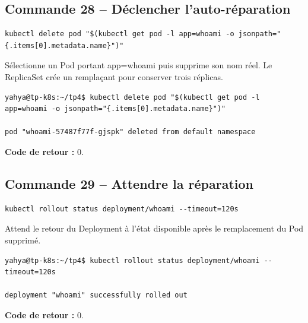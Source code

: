 \documentclass[11pt,a4paper]{article}
\begin{document}
\subsection{Commande 28 -- Déclencher l’auto-réparation}
\begin{lstlisting}
kubectl delete pod "$(kubectl get pod -l app=whoami -o jsonpath="{.items[0].metadata.name}")"
\end{lstlisting}
Sélectionne un Pod portant app=whoami puis supprime son nom réel. Le ReplicaSet crée un remplaçant pour conserver trois réplicas.
\begin{tcolorbox}[terminal,title={Ubuntu / WSL2 -- Commande 28 -- rendu reconstitué}]
\begin{Verbatim}[fontsize=\scriptsize,breaklines=true,breakanywhere=true,breaksymbolleft={},breaksymbolright={}]
yahya@tp-k8s:~/tp4$ kubectl delete pod "$(kubectl get pod -l app=whoami -o jsonpath="{.items[0].metadata.name}")"

pod "whoami-57487f77f-gjspk" deleted from default namespace
\end{Verbatim}
\end{tcolorbox}
\textbf{Code de retour :} 0.

\subsection{Commande 29 -- Attendre la réparation}
\begin{lstlisting}
kubectl rollout status deployment/whoami --timeout=120s
\end{lstlisting}
Attend le retour du Deployment à l’état disponible après le remplacement du Pod supprimé.
\begin{tcolorbox}[terminal,title={Ubuntu / WSL2 -- Commande 29 -- rendu reconstitué}]
\begin{Verbatim}[fontsize=\scriptsize,breaklines=true,breakanywhere=true,breaksymbolleft={},breaksymbolright={}]
yahya@tp-k8s:~/tp4$ kubectl rollout status deployment/whoami --timeout=120s

deployment "whoami" successfully rolled out
\end{Verbatim}
\end{tcolorbox}
\textbf{Code de retour :} 0.
\end{document}
